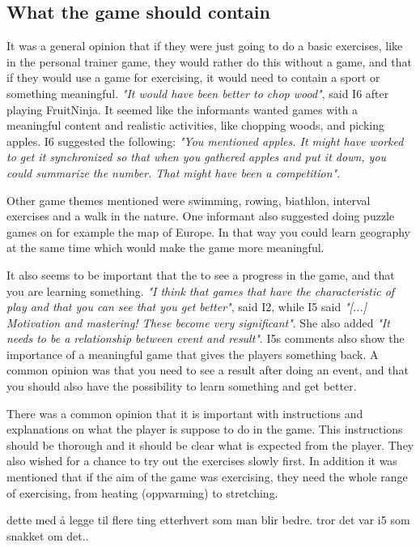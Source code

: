 \subsection{What the game should contain}

It was a general opinion that if they were just going to do a basic exercises, like in the personal trainer game, they would rather do this without a game, and that if they would use a game for exercising, it would need to contain a sport or something meaningful. \emph{"It would have been better to chop wood"}, said I6 after playing FruitNinja. It seemed like the informants wanted games with a meaningful content and realistic activities, like chopping woods, and picking apples. I6 suggested the following: \emph{"You mentioned apples. It might have worked to get it synchronized so that when you gathered apples and put it down, you could summarize the number. That might have been a competition"}.

Other game themes mentioned were swimming, rowing, biathlon, interval exercises and a walk in the nature. One informant also suggested doing puzzle games on for example the map of Europe. In that way you could learn geography at the same time which would make the game more meaningful.

It also seems to be important that the to see a progress in the game, and that you are learning something. \emph{"I think that games that have the characteristic of play and that you can see that you get better"}, said I2, while I5 said \emph{"[...] Motivation and mastering! These become very significant"}. She also added \emph{"It needs to be a relationship between event and result"}. I5s comments also show the importance of a meaningful game that gives the players something back. A common opinion was that you need to see a result after doing an event, and that you should also have the possibility to learn something and get better. 

There was a common opinion that it is important with instructions and explanations on what the player is suppose to do in the game. This instructions should be thorough and it should be clear what is expected from the player. They also wished for a chance to try out the exercises slowly first. In addition it was mentioned that if the aim of the game was exercising, they need the whole range of exercising, from heating (oppvarming) to stretching. 

dette med å legge til flere ting etterhvert som man blir bedre. tror det var i5 som snakket om det..

